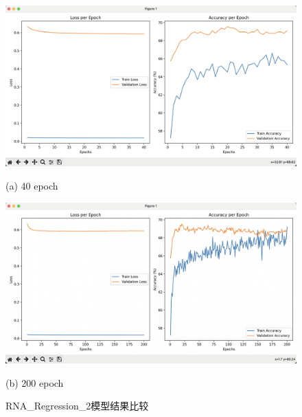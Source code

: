 \documentclass[a4paper,11pt,AutoFakeBold]{ctexart}
\begin{document}
\begin{figure}[h]
    \centering
    \begin{minipage}{0.49\linewidth}
        \centering
        \includegraphics[height=0.55\linewidth]{Figures/2-40.png}
        \caption*{(a) 40 epoch}
    \end{minipage}
    \begin{minipage}{0.49\linewidth}
        \centering
        \includegraphics[height=0.55\linewidth]{Figures/2-200.png}
        \caption*{(b) 200 epoch}
    \end{minipage}
    \caption{RNA\_Regression\_2模型结果比较}
    \label{fig:RNA-Regression-2 Compare}
\end{figure}
\end{document}
